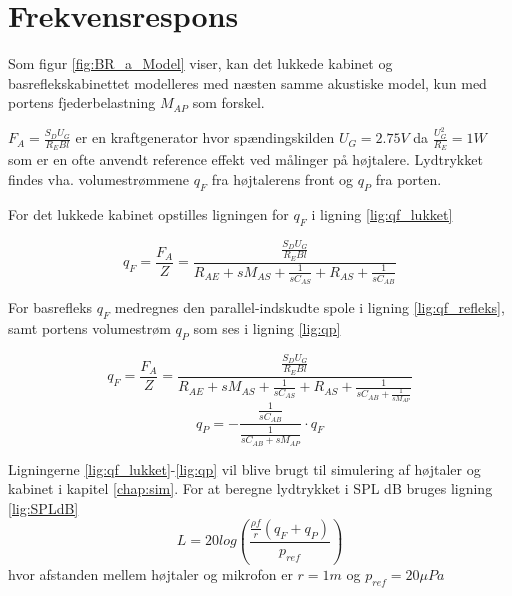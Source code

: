 \chapter{Frekvensrespons}

Som figur \ref{fig:BR_a_Model} viser, kan det lukkede kabinet og basreflekskabinettet modelleres med næsten samme akustiske model, kun med portens fjederbelastning $M_{AP}$ som forskel. 

$F_A=\frac{S_D U_G}{R_E Bl}$ er en kraftgenerator hvor spændingskilden $U_G = 2.75V$ da $\frac{U_G ^2}{R_E}=1W $ som er en ofte anvendt reference effekt ved målinger på højtalere.
Lydtrykket findes vha. volumestrømmene $q_F$ fra højtalerens front og $q_P$ fra porten.

For det lukkede kabinet opstilles ligningen for $q_F$ i ligning \ref{lig:qf_lukket}

\begin{equation}\label{lig:qf_lukket}
q_F = \frac{F_A}{Z} = \frac{ \frac{S_D U_G}{R_E Bl} }{ R_{AE} + sM_{AS} + \frac{1}{ sC_{AS} } + R_{AS} + \frac{1}{sC_{AB} }}
\end{equation}

For basrefleks $ q_F $ medregnes den parallel-indskudte spole i ligning \ref{lig:qf_refleks}, samt portens volumestrøm $ q_P $ som ses i ligning \ref{lig:qp}

\begin{equation}\label{lig:qf_refleks}
q_F=\frac{F_A}{Z}=\frac{\frac{S_D U_G}{R_E Bl}}{ R_{AE}+sM_{AS}+ \frac{1}{sC_{AS} } + R_{AS} + \frac{1}{sC_{AB} + \frac{1}{sM_{AP}}}  }
\end{equation}
\begin{equation}\label{lig:qp}
q_P=-\frac{ \frac{1}{sC_{AB}} }{ \frac{1}{sC_{AB} +sM_{AP}  }}\cdot q_F
\end{equation}

Ligningerne \ref{lig:qf_lukket}-\ref{lig:qp} vil blive brugt til simulering af højtaler og kabinet i kapitel \ref{chap:sim}. For at beregne lydtrykket i SPL dB bruges ligning \ref{lig:SPLdB}
\begin{equation}\label{lig:SPLdB}
L=20 log( \frac{ \frac{\rho f}{r} (q_F+q_P) }{p_{ref}} )
\end{equation}
hvor afstanden mellem højtaler og mikrofon er $r=1m$ og $p_{ref}=20 \mu Pa $
